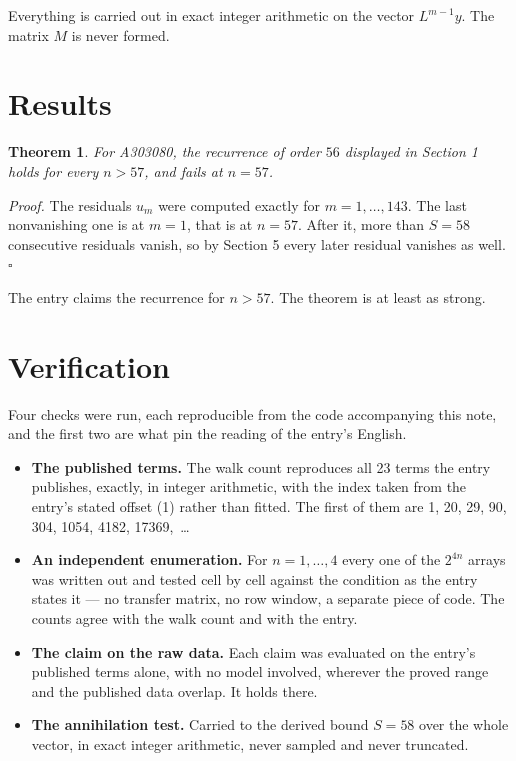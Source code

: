 \documentclass[11pt]{article}
\newtheorem{theorem}{Theorem}
\theoremstyle{definition}
\begin{document}
Everything is carried out in exact integer arithmetic on the vector $L^{m-1}y$. The matrix $M$ is never formed.

\section{Results}

\begin{theorem} For A303080, the recurrence of order $56$ displayed in Section 1 holds for every $n > 57$, and fails at $n = 57$.\end{theorem}

{\itshape Proof.} The residuals $u_m$ were computed exactly for $m = 1,\dots,143$. The last nonvanishing one is at $m = 1$, that is at $n = 57$. After it, more than $S = 58$ consecutive residuals vanish, so by Section 5 every later residual vanishes as well. $\square$

The entry claims the recurrence for $n > 57$. The theorem is at least as strong.

\section{Verification}

Four checks were run, each reproducible from the code accompanying this note, and the first two are what pin the reading of the entry's English.

\begin{itemize}

\item {\bfseries The published terms.} The walk count reproduces all 23 terms the entry publishes, exactly, in integer arithmetic, with the index taken from the entry's stated offset (1) rather than fitted. The first of them are 1, 20, 29, 90, 304, 1054, 4182, 17369,~\dots

\item {\bfseries An independent enumeration.} For $n = 1,\dots,4$ every one of the $2^{4n}$ arrays was written out and tested cell by cell against the condition as the entry states it --- no transfer matrix, no row window, a separate piece of code. The counts agree with the walk count and with the entry.

\item {\bfseries The claim on the raw data.} Each claim was evaluated on the entry's published terms alone, with no model involved, wherever the proved range and the published data overlap. It holds there.

\item {\bfseries The annihilation test.} Carried to the derived bound $S = 58$ over the whole vector, in exact integer arithmetic, never sampled and never truncated.

\end{itemize}
\end{document}
